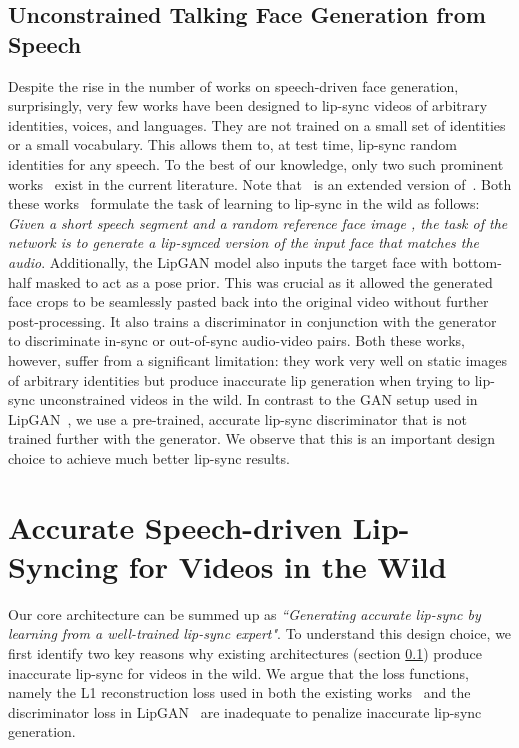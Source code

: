 \documentclass[sigconf]{acmart}
\begin{document}
\subsection{Unconstrained Talking Face Generation from Speech}
\label{subsection:unconstrained}
Despite the rise in the number of works on speech-driven face generation, surprisingly, very few works have been designed to lip-sync videos of arbitrary identities, voices, and languages. They are not trained on a small set of identities or a small vocabulary. This allows them to, at test time, lip-sync random identities for any speech. To the best of our knowledge, only two such prominent works~\cite{jamaludin2019you,kr2019towards} exist in the current literature. Note that~\cite{jamaludin2019you} is an extended version of~\cite{chung2017you}. Both these works~\cite{jamaludin2019you,kr2019towards} formulate the task of learning to lip-sync in the wild as follows: \textit{Given a short speech segment  and a random reference face image , the task of the network is to generate a lip-synced version  of the input face that matches the audio}. Additionally, the LipGAN model also inputs the target face with bottom-half masked to act as a pose prior. This was crucial as it allowed the generated face crops to be seamlessly pasted back into the original video without further post-processing. It also trains a discriminator in conjunction with the generator to discriminate in-sync or out-of-sync audio-video pairs. Both these works, however, suffer from a significant limitation: they work very well on static images of arbitrary identities but produce inaccurate lip generation when trying to lip-sync unconstrained videos in the wild. In contrast to the GAN setup used in LipGAN~\cite{kr2019towards}, we use a pre-trained, accurate lip-sync discriminator that is not trained further with the generator. We observe that this is an important design choice to achieve much better lip-sync results. 

\section{Accurate Speech-driven Lip-Syncing for Videos in the Wild}
\label{section:arch}
Our core architecture can be summed up as \textit{``Generating accurate lip-sync by learning from a well-trained lip-sync expert"}. To understand this design choice, we first identify two key reasons why existing architectures (section \ref{subsection:unconstrained}) produce inaccurate lip-sync for videos in the wild. We argue that the loss functions, namely the L1 reconstruction loss used in both the existing works~\cite{kr2019towards,jamaludin2019you} and the discriminator loss in LipGAN~\cite{kr2019towards} are inadequate to penalize inaccurate lip-sync generation.
\end{document}
